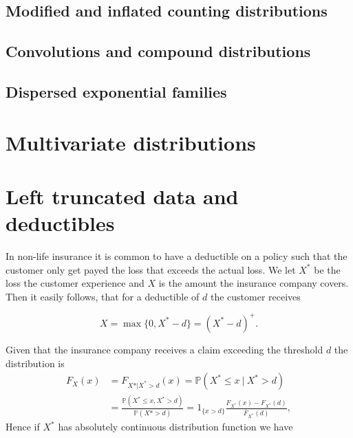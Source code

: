 \documentclass[a4paper,10pt,openany]{book}
\begin{document}
\hypertarget{modified-and-inflated-counting-distributions}{%
\subsection{Modified and inflated counting distributions}\label{modified-and-inflated-counting-distributions}}

\hypertarget{convolutions-and-compound-distributions}{%
\subsection{Convolutions and compound distributions}\label{convolutions-and-compound-distributions}}

\hypertarget{dispersed-exponential-families}{%
\subsection{Dispersed exponential families}\label{dispersed-exponential-families}}

\hypertarget{multivariate-distributions}{%
\section{Multivariate distributions}\label{multivariate-distributions}}

\hypertarget{left-truncated-data-and-deductibles}{%
\section{Left truncated data and deductibles}\label{left-truncated-data-and-deductibles}}

In non-life insurance it is common to have a deductible on a policy such that the customer only get payed the loss that exceeds the actual loss. We let \(X^*\) be the loss the customer experience and \(X\) is the amount the insurance company covers. Then it easily follows, that for a deductible of \(d\) the customer receives

\[
X=\max\{0,X^*-d\}=(X^*-d)^+.
\]

Given that the insurance company receives a claim exceeding the threshold \(d\) the distribution is
\begin{align*}
F_X(x)&=F_{X*\vert X^*>d}(x)=\mathbb P(X^*\le x\ \vert\ X^*>d)\\
&=\frac{\mathbb P(X^*\le x,X^*> d)}{\mathbb P(X*> d)}=1_{\{x>d\}}\frac{F_{X^*}(x)-F_{X^*}(d)}{\overline F_{X^*}(d)},
\end{align*}
Hence if \(X^*\) has absolutely continuous distribution function we have
\end{document}
